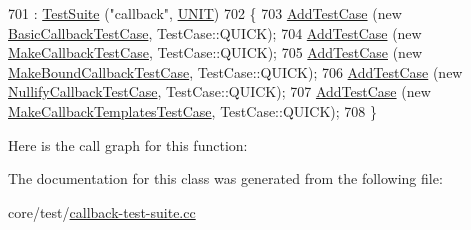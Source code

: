 \begin{DoxyCode}
701   : \hyperlink{classns3_1_1TestSuite_a904b0c40583b744d30908aeb94636d1a}{TestSuite} (\textcolor{stringliteral}{"callback"}, \hyperlink{classns3_1_1TestSuite_a1ebfcab34ec8161e085e8e3a1855eae0a3885375a3787abf60431f8454b3cadbd}{UNIT})
702 \{
703   \hyperlink{classns3_1_1TestCase_a3718088e3eefd5d6454569d2e0ddd835}{AddTestCase} (\textcolor{keyword}{new} \hyperlink{classBasicCallbackTestCase}{BasicCallbackTestCase}, TestCase::QUICK);
704   \hyperlink{classns3_1_1TestCase_a3718088e3eefd5d6454569d2e0ddd835}{AddTestCase} (\textcolor{keyword}{new} \hyperlink{classMakeCallbackTestCase}{MakeCallbackTestCase}, TestCase::QUICK);
705   \hyperlink{classns3_1_1TestCase_a3718088e3eefd5d6454569d2e0ddd835}{AddTestCase} (\textcolor{keyword}{new} \hyperlink{classMakeBoundCallbackTestCase}{MakeBoundCallbackTestCase}, TestCase::QUICK);
706   \hyperlink{classns3_1_1TestCase_a3718088e3eefd5d6454569d2e0ddd835}{AddTestCase} (\textcolor{keyword}{new} \hyperlink{classNullifyCallbackTestCase}{NullifyCallbackTestCase}, TestCase::QUICK);
707   \hyperlink{classns3_1_1TestCase_a3718088e3eefd5d6454569d2e0ddd835}{AddTestCase} (\textcolor{keyword}{new} \hyperlink{classMakeCallbackTemplatesTestCase}{MakeCallbackTemplatesTestCase}, TestCase::QUICK);
708 \}
\end{DoxyCode}


Here is the call graph for this function\+:




The documentation for this class was generated from the following file\+:\begin{DoxyCompactItemize}
\item 
core/test/\hyperlink{callback-test-suite_8cc}{callback-\/test-\/suite.\+cc}\end{DoxyCompactItemize}
